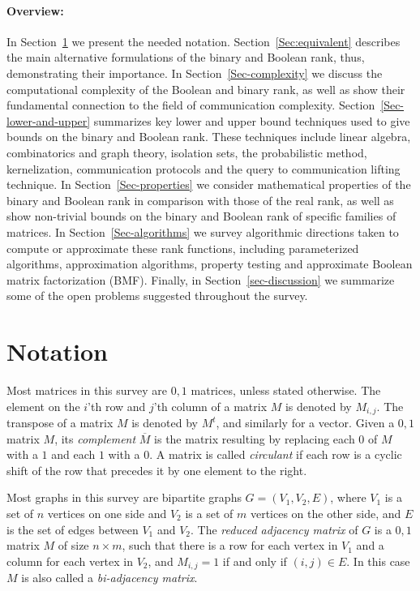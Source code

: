 \documentclass[11pt]{article}
\begin{document}
\paragraph{Overview:}
In Section~\ref{Sec-notation} we present the needed notation.
Section~\ref{Sec:equivalent} describes the main alternative formulations of the binary and Boolean rank, thus, demonstrating their importance.
In Section~\ref{Sec-complexity} we discuss the computational complexity of the Boolean and binary rank, as well as show their fundamental connection to the field of communication complexity.
Section~\ref{Sec-lower-and-upper} summarizes key lower and upper bound techniques used to give bounds on the binary and Boolean rank.
These techniques include linear algebra, combinatorics and graph theory, isolation sets, the probabilistic method, kernelization,
communication protocols and the query to communication lifting technique.
In Section~\ref{Sec-properties} we consider mathematical properties of the binary and Boolean rank in comparison with those of the real rank,
as well as show non-trivial bounds on the binary and Boolean rank of specific families of matrices.
In Section~\ref{Sec-algorithms} we survey algorithmic directions taken to compute or approximate these rank functions,
including parameterized algorithms, approximation algorithms, property testing and approximate Boolean matrix factorization (BMF).
Finally, in Section~\ref{sec-discussion} we summarize some of the open problems suggested throughout the survey.

\section{Notation}
\label{Sec-notation}
Most matrices in this survey are $0,1$ matrices, unless stated otherwise.
The element on the $i$'th row and $j$'th column of a matrix $M$ is denoted by $M_{i,j}$.
The transpose of a matrix $M$ is denoted by $M^t$, and similarly for a vector.
Given a $0,1$ matrix $M$, its {\em complement} $\overline{M}$ is the matrix resulting by replacing each $0$ of $M$ with a $1$ and each $1$ with a $0$.
A matrix is called {\em circulant} if each row is a cyclic shift of the row that precedes it by one element to the right.

Most graphs in this survey are bipartite graphs $G = (V_1,V_2,E)$, where $V_1$ is a set of $n$ vertices on one side and $V_2$ is a set of $m$ vertices on the other side,
and $E$ is the set of edges between $V_1$ and $V_2$.
The {\em reduced  adjacency matrix} of $G$ is a $0,1$ matrix $M$ of size $n \times m$,
such that there is a row for each vertex in $V_1$ and a column for each vertex in $V_2$, and $M_{i,j} = 1$ if and only if $(i,j) \in E$.
In this case $M$ is also called a {\em bi-adjacency matrix}.
\end{document}
